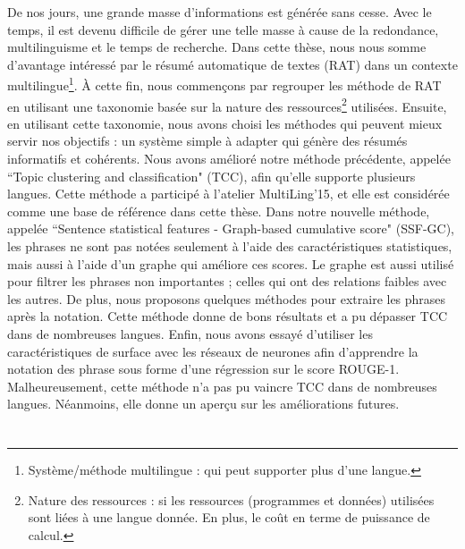 De nos jours, une grande masse d'informations est générée sans cesse.
Avec le temps, il est devenu difficile de gérer une telle masse à cause de la redondance, multilinguisme et le temps de recherche.
Dans cette thèse, nous nous somme d'avantage intéressé par le résumé automatique de textes (RAT) dans un contexte multilingue\footnote{Système/méthode multilingue : qui peut supporter plus d'une langue.}.
À cette fin, nous commençons par regrouper les méthode de RAT en utilisant une taxonomie basée sur la nature des ressources\footnote{Nature des ressources : si les ressources (programmes et données) utilisées sont liées à une langue donnée. En plus, le coût en terme de puissance de calcul.} utilisées.
Ensuite, en utilisant cette taxonomie, nous avons choisi les méthodes qui peuvent mieux servir nos objectifs : un système simple à adapter qui génère des résumés informatifs et cohérents.
Nous avons amélioré notre méthode précédente, appelée ``Topic clustering and classification" (TCC), afin qu'elle supporte plusieurs langues.
Cette méthode a participé à l'atelier MultiLing'15, et elle est considérée comme une base de référence dans cette thèse.
Dans notre nouvelle méthode, appelée ``Sentence statistical features - Graph-based cumulative score" (SSF-GC), les phrases ne sont pas notées seulement à l'aide des caractéristiques statistiques, mais aussi à l'aide d'un graphe qui améliore ces scores.
Le graphe est aussi utilisé pour filtrer les phrases non importantes ; celles qui ont des relations faibles avec les autres. 
De plus, nous proposons quelques méthodes pour extraire les phrases après la notation.
Cette méthode donne de bons résultats et a pu dépasser TCC dans de nombreuses langues.
Enfin, nous avons essayé d'utiliser les caractéristiques de surface avec les réseaux de neurones afin d'apprendre la notation des phrase sous forme d'une régression sur le score ROUGE-1.
Malheureusement, cette méthode n'a pas pu vaincre TCC dans de nombreuses langues.
Néanmoins, elle donne un aperçu sur les améliorations futures.


\chapter*{}

